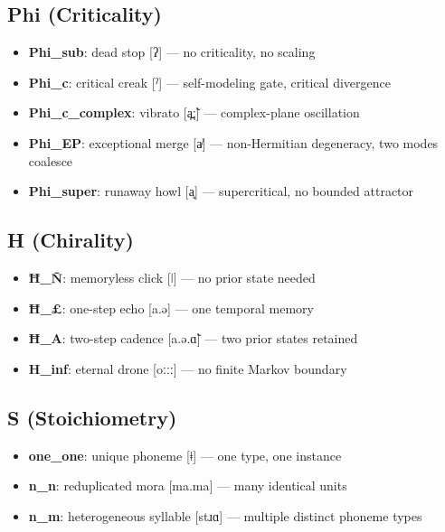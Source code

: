 \documentclass[12pt,a4paper]{article}
\begin{document}
\subsection{Phi (Criticality)}

\begin{itemize}
    \item \textbf{Phi\_sub}: dead stop {[}ʔ{]} --- no criticality, no scaling
    \item \textbf{Phi\_c}: critical creak {[}ˀ{]} --- self-modeling gate, critical divergence
    \item \textbf{Phi\_c\_complex}: vibrato {[}a̪ː̃{]} --- complex-plane oscillation
    \item \textbf{Phi\_EP}: exceptional merge {[}a̸{]} --- non-Hermitian degeneracy, two modes coalesce
    \item \textbf{Phi\_super}: runaway howl {[}a͈{]} --- supercritical, no bounded attractor
\end{itemize}

\subsection{H (Chirality)}

\begin{itemize}
    \item \textbf{Ħ_Ñ}: memoryless click {[}ǀ{]} --- no prior state needed
    \item \textbf{Ħ_£}: one-step echo {[}a.ə{]} --- one temporal memory
    \item \textbf{Ħ_A}: two-step cadence {[}a.ə.ɑ̃{]} --- two prior states retained
    \item \textbf{H\_inf}: eternal drone {[}oːːː{]} --- no finite Markov boundary
\end{itemize}

\subsection{S (Stoichiometry)}

\begin{itemize}
    \item \textbf{one\_one}: unique phoneme {[}ǂ{]} --- one type, one instance
    \item \textbf{n\_n}: reduplicated mora {[}ma.ma{]} --- many identical units
    \item \textbf{n\_m}: heterogeneous syllable {[}stɹɑ{]} --- multiple distinct phoneme types
\end{itemize}
\end{document}
